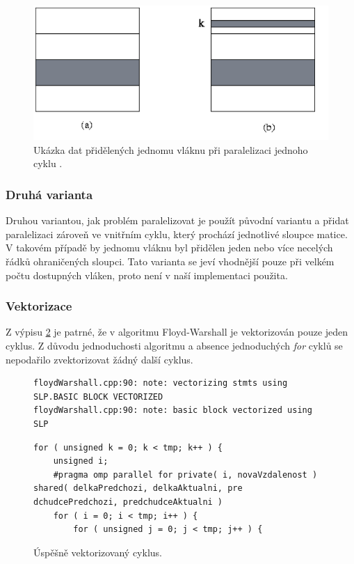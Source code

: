 \begin{figure}
    \centering
    \includegraphics[width=\textwidth]{floyd-openmp}
    \caption{Ukázka dat přidělených jednomu vláknu při paralelizaci jednoho cyklu \cite{w:fw:omp}.}
    \label{f:fw:omp}
\end{figure}


\subsubsection{Druhá varianta}
Druhou variantou, jak problém paralelizovat je použít původní variantu a přidat paralelizaci zároveň ve vnitřním cyklu, který prochází jednotlivé sloupce matice. V takovém případě by jednomu vláknu byl přidělen jeden nebo více necelých řádků ohraničených sloupci. Tato varianta se jeví vhodnější pouze při velkém počtu dostupných vláken, proto není v naší implementaci použita.

\subsubsection{Vektorizace}
Z výpisu \ref{f:fw:vect1} je patrné, že v algoritmu Floyd-Warshall je vektorizován pouze jeden cyklus. Z důvodu jednoduchosti algoritmu a absence jednoduchých \textit{for} cyklů se nepodařilo zvektorizovat žádný další cyklus.

\begin{figure}
    \centering
    \caption{Úspěšně vektorizovaný cyklus.}
	\label{f:fw:vect1}
    \begin{lstlisting}
floydWarshall.cpp:90: note: vectorizing stmts using SLP.BASIC BLOCK VECTORIZED
floydWarshall.cpp:90: note: basic block vectorized using SLP
    \end{lstlisting}
    
	\begin{lstlisting}
for ( unsigned k = 0; k < tmp; k++ ) {
	unsigned i;
	#pragma omp parallel for private( i, novaVzdalenost ) shared( delkaPredchozi, delkaAktualni, pre    dchudcePredchozi, predchudceAktualni )
	for ( i = 0; i < tmp; i++ ) {
		for ( unsigned j = 0; j < tmp; j++ ) {
	\end{lstlisting}
\end{figure}


